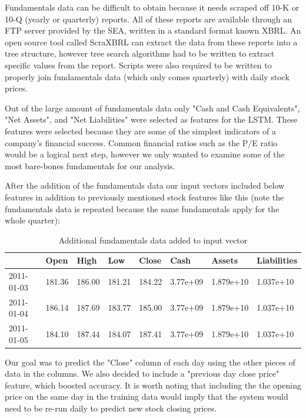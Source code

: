 \documentclass{article}
\begin{document}
Fundamentals data can be difficult to obtain because it needs scraped off 10-K or 10-Q (yearly or quarterly) reports. All of these reports are available through an FTP server provided by the SEA, written in a standard format known XBRL. An open source tool called ScraXBRL can extract the data from these reports into a tree structure, however tree search algorithms had to be written to extract specific values from the report. Scripts were also required to be written to properly join fundamentals data (which only comes quarterly) with daily stock prices. 

Out of the large amount of fundamentals data only "Cash and Cash Equivalents", "Net Assets", and "Net Liabilities" were selected as features for the LSTM. These features were selected because they are some of the simplest indicators of a company's financial success. Common financial ratios such as the P/E ratio would be a logical next step, however we only wanted to examine some of the most bare-bones fundamentals for our analysis. 

After the addition of the fundamentals data our input vectors included below features in addition to previously mentioned stock features like this (note the fundamentals data is repeated because the same fundamentals apply for the whole quarter):
\begin{table}[H]
\centering
\begin{adjustbox}{width=0.5\textwidth}
\small
\begin{tabular}{|l|l|l|l|l|l|l|l|}
\hline
 & Open & High & Low & Close  & Cash & Assets & Liabilities \\ \hline
2011-01-03 & 181.36 & 186.00 & 181.21 & 184.22 & 3.77e+09 & 1.879e+10 & 1.037e+10 \\ \hline
2011-01-04 & 186.14 & 187.69 & 183.77 & 185.00 & 3.77e+09 & 1.879e+10 & 1.037e+10 \\ \hline
2011-01-05 & 184.10 & 187.44 & 184.07 & 187.41 & 3.77e+09 & 1.879e+10 & 1.037e+10 \\ \hline
\end{tabular}
\end{adjustbox}
\caption{Additional fundamentals data added to input vector}
\end{table}

Our goal was to predict the "Close" column of each day using the other pieces of data in the columns.  We also decided to include a "previous day close price" feature, which boosted accuracy. It is worth noting that including the the opening price on the same day in the training data would imply that the system would need to be re-run daily to predict new stock closing prices.
\end{document}
